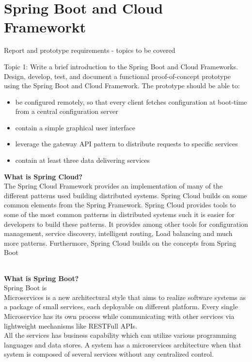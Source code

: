 \chapter{Spring Boot and Cloud Frameworkt}\label{ch:spring}
Report and prototype requirements - topics to be covered

Topic 1: Write a brief introduction to the Spring Boot and Cloud Frameworks. Design, develop, test, and document a functional proof-of-concept prototype using the Spring Boot and Cloud Framework. The prototype should be able to:
\begin{itemize}
\item be configured remotely, so that every client fetches configuration at boot-time from a central configuration server
\item contain a simple graphical user interface
\item leverage the gateway API pattern to distribute requests to specific services
\item contain at least three data delivering services 
\end{itemize}

\textbf{What is Spring Cloud?}\\
The Spring Cloud Framework provides an implementation of many of the different patterns used  building distributed systems. Spring Cloud builds on some common elements from the Spring Framework. Spring Cloud provides tools to some of the most common patterns in distributed systems such it is easier for developers to build these patterns. It provides among other tools for configuration management, service discovery, intelligent routing, Load balancing and much more patterns.
Furthermore, Spring Cloud builds on the concepts from Spring Boot  

\\

\textbf{What is Spring Boot?}\\
Spring Boot is 
\\
Microservices is a new architectural style that aims to realize software systems as a package of small services, each deployable on different platform. Every single Microservice has its own process while communicating with other services via lightweight mechanisms like RESTFull APIs.\\

All the services has business capability which can utilize various programming languages and data stores. A system has a microservices architecture when that system is composed of several services without any centralized control.\\

